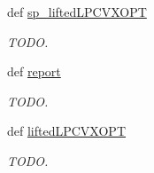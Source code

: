 \begin{DoxyCompactItemize}
def \hyperlink{namespaceliftedLP__glpk_a8e092f597b67751515bbebf6692c5eaa}{sp\-\_\-lifted\-L\-P\-C\-V\-X\-O\-P\-T}
\begin{DoxyCompactList}\small\item\em T\-O\-D\-O. \end{DoxyCompactList}\item 
def \hyperlink{namespaceliftedLP__glpk_a9e18e21d4de3c75150d99ee9b8876c11}{report}
\begin{DoxyCompactList}\small\item\em T\-O\-D\-O. \end{DoxyCompactList}\item 
def \hyperlink{namespaceliftedLP__glpk_afed71a9bedc77e19434821c5353fb459}{lifted\-L\-P\-C\-V\-X\-O\-P\-T}
\begin{DoxyCompactList}\small\item\em T\-O\-D\-O. \end{DoxyCompactList}\end{DoxyCompactItemize}
